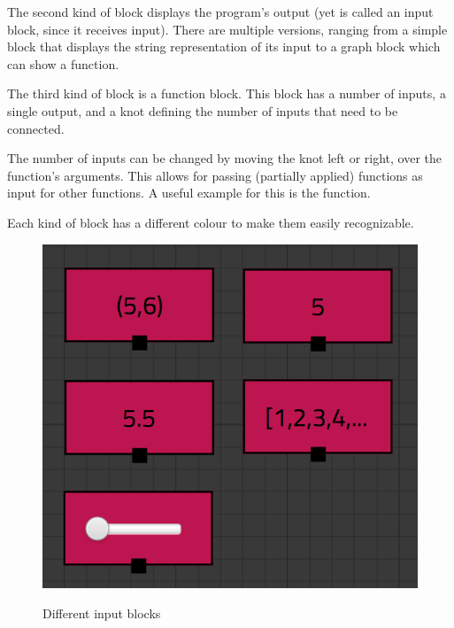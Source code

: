 The second kind of block displays the program's output (yet is called an input block, since it receives input).  
There are multiple versions, ranging from a simple block that displays the string representation of its input to a graph block which can show a function. 

The third kind of block is a function block. This block has a number of inputs, a single output, and a knot defining the number of inputs that need to be connected. 

The number of inputs can be changed by moving the knot left or right, over the function's arguments.
This allows for passing (partially applied) functions as input for other functions. 
A useful example for this is the  function.

Each kind of block has a different colour to make them easily recognizable.

\begin{figure}[p]
	\centering
	\includegraphics[scale=0.5]{Images/blocks-inputs}
	\label{fig:blocks-inputs}
	\caption{Different input blocks}
\end{figure}

